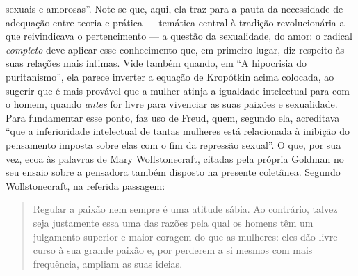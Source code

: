 sexuais e amorosas''. Note-se que, aqui, ela traz para a pauta da
necessidade de adequação entre teoria e prática --- temática central à
tradição revolucionária a que reivindicava o pertencimento --- a questão
da sexualidade, do amor: o radical \emph{completo} deve aplicar esse
conhecimento que, em primeiro lugar, diz respeito às suas relações mais
íntimas. Vide também quando, em ``A hipocrisia do puritanismo'', ela
parece inverter a equação de Kropótkin acima colocada, ao sugerir que é
mais provável que a mulher atinja a igualdade intelectual para com o
homem, quando \emph{antes} for livre para vivenciar as suas paixões e
sexualidade. Para fundamentar esse ponto, faz uso de Freud, quem,
segundo ela, acreditava ``que a inferioridade intelectual de tantas
mulheres está relacionada à inibição do pensamento imposta sobre elas
com o fim da repressão sexual''. O que, por sua vez, ecoa às palavras de
Mary Wollstonecraft, citadas pela própria Goldman no seu ensaio sobre a
pensadora também disposto na presente coletânea. Segundo Wollstonecraft,
na referida passagem:

\begin{quote}
Regular a paixão nem sempre é uma atitude sábia. Ao contrário, talvez
seja justamente essa uma das razões pela qual os homens têm um
julgamento superior e maior coragem do que as mulheres: eles dão livre
curso à sua grande paixão e, por perderem a si mesmos com mais
frequência, ampliam as suas ideias.
\end{quote}

